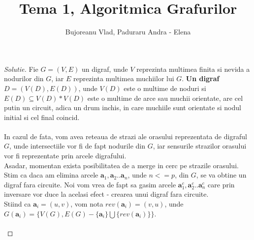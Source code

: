 \documentclass[12pt]{article}
\newenvironment{problema}[2][Problema]{\begin{trivlist}
\item[\hskip \labelsep {\bfseries #1}\hskip \labelsep {\bfseries #2.}]}{\end{trivlist}}
\begin{document}
 
 
\title{\textbf{Tema 1, Algoritmica Grafurilor}}
\author{
  Bujoreanu Vlad, Paduraru Andra - Elena\\
}
\date{}
\maketitle
 
\begin{problema}{1}
\end{problema}

\begin{proof}[Solutie]
Fie \(G = (V, E)\) un digraf, unde \(V\) reprezinta multimea finita si nevida a nodurilor din \(G\), iar \(E\) reprezinta multimea muchiilor lui \(G\). \textbf{Un digraf} \(D = (V(D), E(D))\), unde \(V(D)\) este o multime de noduri si \(E(D) \subseteq V(D) * V(D)\) este o multime de arce sau muchii orientate, are cel putin un circuit, adica un drum inchis, in care muchiile sunt orientate si nodul initial si cel final coincid. \\\\
In cazul de fata, vom avea reteaua de strazi ale orasului reprezentata de digraful \(G\), unde intersectiile vor fi de fapt nodurile din \(G\), iar sensurile strazilor orasului vor fi reprezentate prin arcele digrafului. 
\\Asadar, momentan exista posibilitatea de a merge in cerc pe strazile orasului. Stim ca daca am elimina arcele \(\mathbf{a}_{1}, \mathbf{a}_{2} .. \mathbf{a}_{n}\), unde \(n<=p\), din \(G\), se va obtine un digraf fara circuite. Noi vom vrea de fapt sa gasim arcele \(\mathbf{a}^{c}_{1}, \mathbf{a}^{c}_{2} .. \mathbf{a}^{c}_{n}\) care prin inversare vor duce la acelasi efect - crearea unui digraf fara circuite.\\
Stiind ca \(\mathbf{a}_{i}=(u,v)\), vom nota \(rev(\mathbf{a}_{i})=(v,u)\), unde \(G(\mathbf{a}_{i})=\{V(G), E(G)-\{\mathbf{a}_{i}\}\bigcup\{rev(\mathbf{a}_{i})\}\}\). \\\\

\end{proof}
\end{document}
